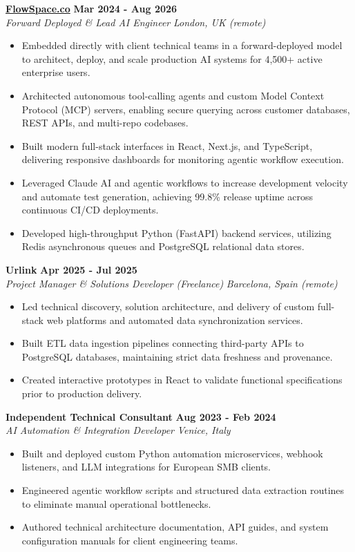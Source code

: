 \documentclass[10pt,a4paper]{article}
\newcommand{\role}[4]{%
  \textbf{#1} \hfill \textbf{#2}\\[1pt]%
  \textit{#3} \hfill \textit{#4}\\[2pt]%
}
\begin{document}
\role{\href{https://flowspace.co}{FlowSpace.co}}{Mar 2024 - Aug 2026}{Forward Deployed \& Lead AI Engineer}{London, UK (remote)}
\begin{itemize}
  \item Embedded directly with client technical teams in a forward-deployed model to architect, deploy, and scale production AI systems for 4,500+ active enterprise users.
  \item Architected autonomous tool-calling agents and custom Model Context Protocol (MCP) servers, enabling secure querying across customer databases, REST APIs, and multi-repo codebases.
  \item Built modern full-stack interfaces in React, Next.js, and TypeScript, delivering responsive dashboards for monitoring agentic workflow execution.
  \item Leveraged Claude AI and agentic workflows to increase development velocity and automate test generation, achieving 99.8\% release uptime across continuous CI/CD deployments.
  \item Developed high-throughput Python (FastAPI) backend services, utilizing Redis asynchronous queues and PostgreSQL relational data stores.
\end{itemize}

\role{Urlink}{Apr 2025 - Jul 2025}{Project Manager \& Solutions Developer (Freelance)}{Barcelona, Spain (remote)}
\begin{itemize}
  \item Led technical discovery, solution architecture, and delivery of custom full-stack web platforms and automated data synchronization services.
  \item Built ETL data ingestion pipelines connecting third-party APIs to PostgreSQL databases, maintaining strict data freshness and provenance.
  \item Created interactive prototypes in React to validate functional specifications prior to production delivery.
\end{itemize}

\role{Independent Technical Consultant}{Aug 2023 - Feb 2024}{AI Automation \& Integration Developer}{Venice, Italy}
\begin{itemize}
  \item Built and deployed custom Python automation microservices, webhook listeners, and LLM integrations for European SMB clients.
  \item Engineered agentic workflow scripts and structured data extraction routines to eliminate manual operational bottlenecks.
  \item Authored technical architecture documentation, API guides, and system configuration manuals for client engineering teams.
\end{itemize}
\end{document}
